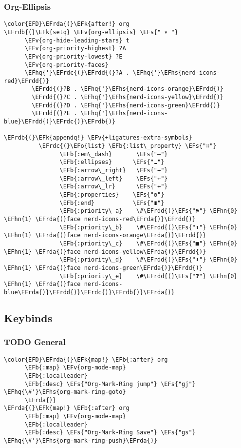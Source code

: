 \documentclass{article}
\newcommand{\EFs}[1]{\textcolor{EFs}{#1}} %
\newcommand{\EFk}[1]{\textcolor{EFk}{#1}} %
\newcommand{\EFb}[1]{\textcolor{EFb}{#1}} %
\newcommand{\EFv}[1]{\textcolor{EFv}{#1}} %
\newcommand{\EFo}[1]{\textcolor{EFo}{#1}} %
\newcommand{\EFhn}[1]{\textcolor{EFhn}{\textbf{#1}}} %
\newcommand{\EFhq}[1]{#1} %
\newcommand{\EFhs}[1]{\textcolor{EFhs}{#1}} %
\newcommand{\EFrda}[1]{\textcolor{EFrda}{#1}} %
\newcommand{\EFrdb}[1]{\textcolor{EFrdb}{#1}} %
\newcommand{\EFrdc}[1]{\textcolor{EFrdc}{#1}} %
\newcommand{\EFrdd}[1]{\textcolor{EFrdd}{#1}} %
\begin{document}
\subsubsection{Org-Ellipsis}
\label{sec:org713add2}
\begin{Code}
\begin{Verbatim}
\color{EFD}\EFrda{(}\EFk{after!} org
\EFrdb{(}\EFk{setq} \EFv{org-ellipsis} \EFs{" ▾ "}
      \EFv{org-hide-leading-stars} t
      \EFv{org-priority-highest} ?A
      \EFv{org-priority-lowest} ?E
      \EFv{org-priority-faces}
      \EFhq{'}\EFrdc{(}\EFrdd{(}?A . \EFhq{'}\EFhs{nerd-icons-red}\EFrdd{)}
        \EFrdd{(}?B . \EFhq{'}\EFhs{nerd-icons-orange}\EFrdd{)}
        \EFrdd{(}?C . \EFhq{'}\EFhs{nerd-icons-yellow}\EFrdd{)}
        \EFrdd{(}?D . \EFhq{'}\EFhs{nerd-icons-green}\EFrdd{)}
        \EFrdd{(}?E . \EFhq{'}\EFhs{nerd-icons-blue}\EFrdd{)}\EFrdc{)}\EFrdb{)}

\EFrdb{(}\EFk{appendq!} \EFv{+ligatures-extra-symbols}
          \EFrdc{(}\EFo{list} \EFb{:list\_property} \EFs{"∷"}
                \EFb{:em\_dash}       \EFs{"—"}
                \EFb{:ellipses}      \EFs{"…"}
                \EFb{:arrow\_right}   \EFs{"→"}
                \EFb{:arrow\_left}    \EFs{"←"}
                \EFb{:arrow\_lr}      \EFs{"↔"}
                \EFb{:properties}    \EFs{"⚙"}
                \EFb{:end}           \EFs{"∎"}
                \EFb{:priority\_a}    \#\EFrdd{(}\EFs{"⚑"} \EFhn{0} \EFhn{1} \EFrda{(}face nerd-icons-red\EFrda{)}\EFrdd{)}
                \EFb{:priority\_b}    \#\EFrdd{(}\EFs{"⬆"} \EFhn{0} \EFhn{1} \EFrda{(}face nerd-icons-orange\EFrda{)}\EFrdd{)}
                \EFb{:priority\_c}    \#\EFrdd{(}\EFs{"■"} \EFhn{0} \EFhn{1} \EFrda{(}face nerd-icons-yellow\EFrda{)}\EFrdd{)}
                \EFb{:priority\_d}    \#\EFrdd{(}\EFs{"⬇"} \EFhn{0} \EFhn{1} \EFrda{(}face nerd-icons-green\EFrda{)}\EFrdd{)}
                \EFb{:priority\_e}    \#\EFrdd{(}\EFs{"❓"} \EFhn{0} \EFhn{1} \EFrda{(}face nerd-icons-blue\EFrda{)}\EFrdd{)}\EFrdc{)}\EFrdb{)}\EFrda{)}
\end{Verbatim}
\end{Code}
\subsection{Keybinds}
\label{sec:org6db480c}
\subsubsection{{\bfseries\sffamily TODO} General}
\label{sec:orgcd5ff19}
\begin{Code}
\begin{Verbatim}
\color{EFD}\EFrda{(}\EFk{map!} \EFb{:after} org
      \EFb{:map} \EFv{org-mode-map}
      \EFb{:localleader}
      \EFb{:desc} \EFs{"Org-Mark-Ring jump"} \EFs{"gj"} \EFhq{\#'}\EFhs{org-mark-ring-goto}
      \EFrda{)}
\EFrda{(}\EFk{map!} \EFb{:after} org
      \EFb{:map} \EFv{org-mode-map}
      \EFb{:localleader}
      \EFb{:desc} \EFs{"Org-Mark-Ring Save"} \EFs{"gs"} \EFhq{\#'}\EFhs{org-mark-ring-push}\EFrda{)}
\end{Verbatim}
\end{Code}
\end{document}
